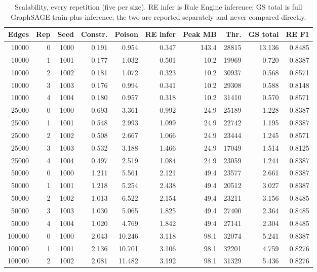 \begin{table}[t]
\centering
\caption{Scalability, every repetition (five per size). RE infer is Rule Engine inference; GS total is full GraphSAGE train-plus-inference; the two are reported separately and never compared directly.}
\label{tab:scalperrep}
{\small
\begin{tabular}{rrrrrrrrrr}
\toprule
Edges & Rep & Seed & Constr. & Poison & RE infer & Peak MB & Thr. & GS total & RE F1 \\
\midrule
10000 & 0 & 1000 & 0.191 & 0.954 & 0.347 & 143.4 & 28815 & 13.136 & 0.8485 \\
10000 & 1 & 1001 & 0.177 & 1.032 & 0.501 & 10.2 & 19969 & 0.720 & 0.8387 \\
10000 & 2 & 1002 & 0.181 & 1.072 & 0.323 & 10.2 & 30937 & 0.568 & 0.8571 \\
10000 & 3 & 1003 & 0.176 & 0.994 & 0.341 & 10.2 & 29308 & 0.588 & 0.8148 \\
10000 & 4 & 1004 & 0.180 & 0.957 & 0.318 & 10.2 & 31410 & 0.570 & 0.8571 \\
25000 & 0 & 1000 & 0.693 & 3.361 & 0.992 & 24.9 & 25189 & 1.228 & 0.8387 \\
25000 & 1 & 1001 & 0.548 & 2.993 & 1.099 & 24.9 & 22742 & 1.195 & 0.8387 \\
25000 & 2 & 1002 & 0.508 & 2.667 & 1.066 & 24.9 & 23444 & 1.245 & 0.8571 \\
25000 & 3 & 1003 & 0.532 & 3.188 & 1.466 & 24.9 & 17049 & 1.514 & 0.8125 \\
25000 & 4 & 1004 & 0.497 & 2.519 & 1.084 & 24.9 & 23059 & 1.244 & 0.8387 \\
50000 & 0 & 1000 & 1.211 & 5.561 & 2.121 & 49.4 & 23577 & 2.661 & 0.8387 \\
50000 & 1 & 1001 & 1.218 & 5.254 & 2.438 & 49.4 & 20512 & 3.027 & 0.8387 \\
50000 & 2 & 1002 & 1.013 & 6.522 & 2.154 & 49.4 & 23211 & 3.156 & 0.8485 \\
50000 & 3 & 1003 & 1.030 & 5.065 & 1.825 & 49.4 & 27400 & 2.364 & 0.8485 \\
50000 & 4 & 1004 & 1.020 & 4.769 & 1.842 & 49.4 & 27141 & 2.304 & 0.8485 \\
100000 & 0 & 1000 & 2.043 & 10.246 & 3.118 & 98.1 & 32074 & 5.241 & 0.8387 \\
100000 & 1 & 1001 & 2.136 & 10.701 & 3.106 & 98.1 & 32201 & 4.759 & 0.8276 \\
100000 & 2 & 1002 & 2.081 & 11.482 & 3.192 & 98.1 & 31329 & 5.436 & 0.8276 \\

\end{tabular}}
\end{table}
